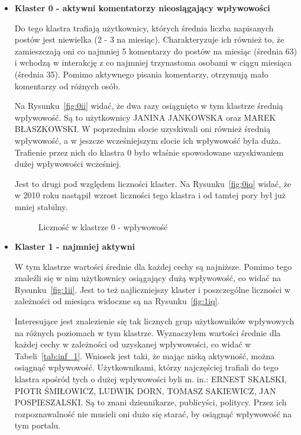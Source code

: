 \documentclass[polish,12pt]{aghthesis}
\begin{document}
\begin{itemize}
    \item \textbf{Klaster 0 - aktywni komentatorzy nieosiągający wpływowości}
    
    Do tego klastra trafiają użytkownicy, których średnia liczba napisanych postów jest niewielka (2 - 3 na miesiąc). Charakteryzuje ich również to, że zamieszczają oni co najmniej 5 komentarzy do postów na miesiąc (średnia 63) i wchodzą w interakcję z co najmniej trzynastoma osobami w ciągu miesiąca (średnia 35). Pomimo aktywnego pisania komentarzy, otrzymują mało komentarzy od różnych osób. 
    
    Na Rysunku~\ref{fig:0ii} widać, że dwa razy osiągnięto w tym klastrze średnią wpływowość. Są to użytkownicy JANINA JANKOWSKA oraz MAREK BŁASZKOWSKI. W poprzednim slocie uzyskiwali oni również średnią wpływowość, a w jeszcze wcześniejszym slocie ich wpływowość była duża. Trafienie przez nich do klastra 0 było właśnie spowodowane uzyskiwaniem dużej wpływowości wcześniej.
    
    Jest to drugi pod względem liczności klaster. Na Rysunku~\ref{fig:0iq} widać, że w 2010 roku nastąpił wzrost liczności tego klastra i od tamtej pory był już mniej stabilny.
    
        \begin{figure}[ht] 
    \centering
    \hfill%
    \caption{Liczność w klastrze 0 - wpływowość}
    \label{f:0i}
    \end{figure}



\item \textbf{Klaster 1 - najmniej aktywni}

W tym klastrze wartości średnie dla każdej cechy są najniższe. Pomimo tego znaleźli się w nim użytkownicy osiągający dużą wpływowość, co widać na Rysunku~\ref{fig:1ii}. Jest to też najliczniejszy klaster i poszczególne liczności w zależności od miesiąca widoczne są na Rysunku~\ref{fig:1iq}.

Interesujące jest znalezienie się tak licznych grup użytkowników wpływowych na różnych poziomach w tym klastrze. Wyznaczyłem wartości średnie dla każdej cechy w zależności od uzyskanej wpływowości, co widać w Tabeli~\ref{tab:inf_1}. Wniosek jest taki, że mając niską aktywność, można osiągnąć wpływowość. Użytkownikami, którzy najczęściej trafiali do tego klastra spośród tych o dużej wpływowości byli m. in.: ERNEST SKALSKI, PIOTR ŚMIŁOWICZ, LUDWIK DORN, TOMASZ SAKIEWICZ, JAN POSPIESZALSKI. Są to znani dziennikarze, publicyści, politycy. Przez ich rozpoznawalność nie musieli oni dużo się starać, by osiągnąć wpływowość na tym portalu.


\end{itemize}
\end{document}
